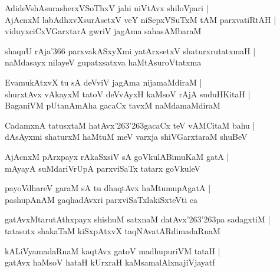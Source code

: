 \begin{shloka}
AdideVshAsurasherxVSoThxV ja{hi} niVtAvx shiloVpari |\\
AjAcnxM labAdhxvXsurAsetxV veY niSepxVSuTxM tAM parxvatiRtAH |\\
viduyxciCxVGarxtarA gwriV jagAma sahasAMbaraM  
\end{shloka}

\begin{shloka}
shaqnU rAja\char'366 parxvakASxyXmi yatArxsetxV shaturxrutatxmaH |\\
naMdasayx nilayeV gupatxsatxva haMtAsuroVtatxma
\end{shloka}

\begin{shloka}
EvamukAtxvX tu sA deVviV jagAma nijamaMdiraM |\\
shurxtAvx vAkayxM tatoV deVvAyxH kaMsoV rAjA suduHKitaH |\\
BaganiVM pUtanAmAha gacaCx tavxM naMdamaMdiraM
\end{shloka}

\begin{shloka}
CadamxnA tatusxtaM hatAvx\char'263\char'263gacaCx teV vAMCitaM bahu |\\
dAsAyxmi shaturxM haMtuM meV varxja shiVGarxtaraM shuBeV
\end{shloka}

\begin{shloka}
AjAcnxM pArxpayx rAkaSxsiV sA goVkulABimuKaM gatA |\\
mAyayA suMdariVrUpA parxviSaTx tatarx goVkuleV
\end{shloka}

\begin{shloka}
payoVdhareV garaM sA tu dhaqtAvx haMtumupAgatA |\\
pashupAnAM gaqhadAvxri parxviSaTxlakiSxteVti ca 
\end{shloka}

\begin{shloka}
gatAvxMtarutAthxpayx shishuM satxnaM datAvx\char'263\char'263pa sadagxtiM |\\
tatasutx shakaTaM kiSxpAtxvX taqNAvatARdimadaRnaM
\end{shloka}

\begin{shloka}
kALiVyamadaRnaM kaqtAvx gatoV madhupuriVM tataH |\\
gatAvx haMsoV hataH kUrxraH kaMsamalAlxnajiVjayatf
\end{shloka}

